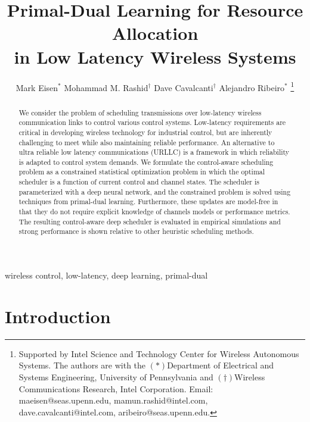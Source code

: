 \documentclass[conference,10pt]{IEEEtran}
\begin{document}
 
%

\title{Primal-Dual Learning for Resource Allocation \\ in Low Latency Wireless Systems}
\author{Mark Eisen$^*$ \quad Mohammad M. Rashid$^\dagger$ \quad 
			Dave Cavalcanti$^\dagger$ \quad Alejandro Ribeiro$^*$
\thanks{{Supported by Intel Science and Technology Center for Wireless Autonomous Systems. The authors are with the $(*)$Department of Electrical and Systems Engineering, University of Pennsylvania and $(\dagger)$Wireless Communications Research, Intel Corporation. Email: maeisen@seas.upenn.edu, mamun.rashid@intel.com, dave.cavalcanti@intel.com, aribeiro@seas.upenn.edu}.}}


\maketitle

%
\begin{abstract}
We consider the problem of scheduling transmissions over low-latency wireless communication links to control various control systems. Low-latency requirements are critical in developing wireless technology for industrial control, but are inherently challenging to meet while also maintaining reliable performance. An alternative to ultra reliable low latency communications (URLLC) is a framework in which reliability is adapted to control system demands. We formulate the control-aware scheduling problem as a constrained statistical optimization problem in which the optimal scheduler is a function of current control and channel states. The scheduler is parameterized with a deep neural network, and the constrained problem is solved using techniques from primal-dual learning. Furthermore, these updates are model-free in that they do not require explicit knowledge of channels models or performance metrics. The resulting control-aware deep scheduler is evaluated in empirical simulations and strong performance is shown relative to other heuristic scheduling methods.
\end{abstract}
%

\begin{IEEEkeywords}
wireless control, low-latency, deep learning, primal-dual
\end{IEEEkeywords}


\section{Introduction}
\end{document}
